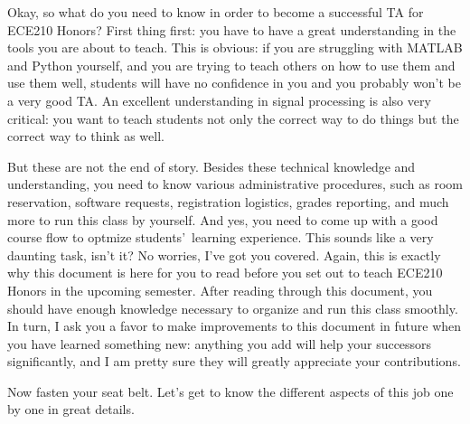 Okay, so what do you need to know in order to become a successful TA for ECE210 Honors? First thing first: you have to have a great understanding in the tools you are about to teach. This is obvious: if you are struggling with MATLAB and Python yourself, and you are trying to teach others on how to use them and use them well, students will have no confidence in you and you probably won\rq t be a very good TA. An excellent understanding in signal processing is also very critical: you want to teach students not only the correct way to do things but the correct way to think as well.

But these are not the end of story. Besides these technical knowledge and understanding, you need to know various administrative procedures, such as room reservation, software requests, registration logistics, grades reporting, and much more to run this class by yourself. And yes, you need to come up with a good course flow to optmize students\rq \
 learning experience. This sounds like a very daunting task, isn\rq t it? No worries, I\rq ve got you covered. Again, this is exactly why this document is here for you to read before you set out to teach ECE210 Honors in the upcoming semester. After reading through this document, you should have enough knowledge necessary to organize and run this class smoothly. In turn, I ask you a favor to make improvements to this document in future when you have learned something new: anything you add will help your successors significantly, and I am pretty sure they will greatly appreciate your contributions.

Now fasten your seat belt. Let\rq s get to know the different aspects of this job one by one in great details.